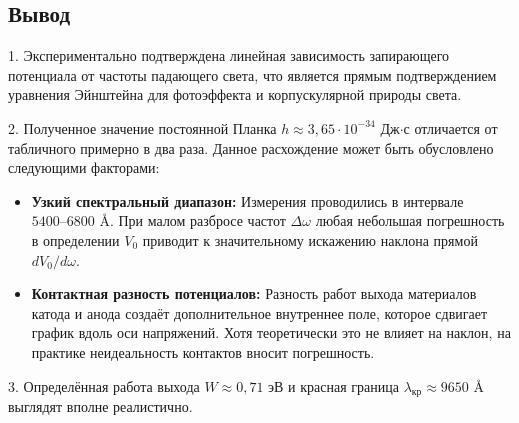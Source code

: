 \documentclass[12pt, a4paper]{article}
\begin{document}
\subsection*{Вывод}
1. Экспериментально подтверждена линейная зависимость запирающего потенциала от частоты падающего света, что является прямым подтверждением уравнения Эйнштейна для фотоэффекта и корпускулярной природы света.

2. Полученное значение постоянной Планка $h \approx 3{,}65 \cdot 10^{-34}$ Дж$\cdot$с отличается от табличного примерно в два раза. Данное расхождение может быть обусловлено следующими факторами:
\begin{itemize}
    \item \textbf{Узкий спектральный диапазон:} Измерения проводились в интервале $5400 \text{--} 6800$ \AA. При малом разбросе частот $\Delta\omega$ любая небольшая погрешность в определении $V_0$ приводит к значительному искажению наклона прямой $dV_0/d\omega$.
    \item \textbf{Контактная разность потенциалов:} Разность работ выхода материалов катода и анода создаёт дополнительное внутреннее поле, которое сдвигает график вдоль оси напряжений. Хотя теоретически это не влияет на наклон, на практике неидеальность контактов вносит погрешность.
\end{itemize}

3. Определённая работа выхода $W \approx 0{,}71$ эВ и красная граница $\lambda_{\text{кр}} \approx 9650$ \AA{} выглядят вполне реалистично.

\end{document}
